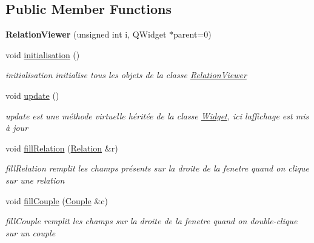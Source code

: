 \subsection*{Public Member Functions}
\begin{DoxyCompactItemize}
\item 
\mbox{\label{classRelationViewer_ad3be69ff8a6363a5bd929ad97ea4bc21}} 
{\bfseries Relation\+Viewer} (unsigned int i, Q\+Widget $\ast$parent=0)
\item 
\mbox{\label{classRelationViewer_a33eeeabaf7997a37990c4174ac9b421c}} 
void \hyperlink{classRelationViewer_a33eeeabaf7997a37990c4174ac9b421c}{initialisation} ()
\begin{DoxyCompactList}\small\item\em initialisation initialise tous les objets de la classe \hyperlink{classRelationViewer}{Relation\+Viewer} \end{DoxyCompactList}\item 
\mbox{\label{classRelationViewer_a264358e294cd4b94f5061f5aed79c856}} 
void \hyperlink{classRelationViewer_a264358e294cd4b94f5061f5aed79c856}{update} ()
\begin{DoxyCompactList}\small\item\em update est une méthode virtuelle héritée de la classe \hyperlink{classWidget}{Widget}, ici l\textquotesingle{}affichage est mis à jour \end{DoxyCompactList}\item 
void \hyperlink{classRelationViewer_a236974b7e44ea4c67da7794812623194}{fill\+Relation} (\hyperlink{classRelation}{Relation} \&r)
\begin{DoxyCompactList}\small\item\em fill\+Relation remplit les champs présents sur la droite de la fenetre quand on clique sur une relation \end{DoxyCompactList}\item 
void \hyperlink{classRelationViewer_aa3923d489adae30c57fd94b64ced8924}{fill\+Couple} (\hyperlink{classCouple}{Couple} \&c)
\begin{DoxyCompactList}\small\item\em fill\+Couple remplit les champs sur la droite de la fenetre quand on double-\/clique sur un couple \end{DoxyCompactList}\end{DoxyCompactItemize}
